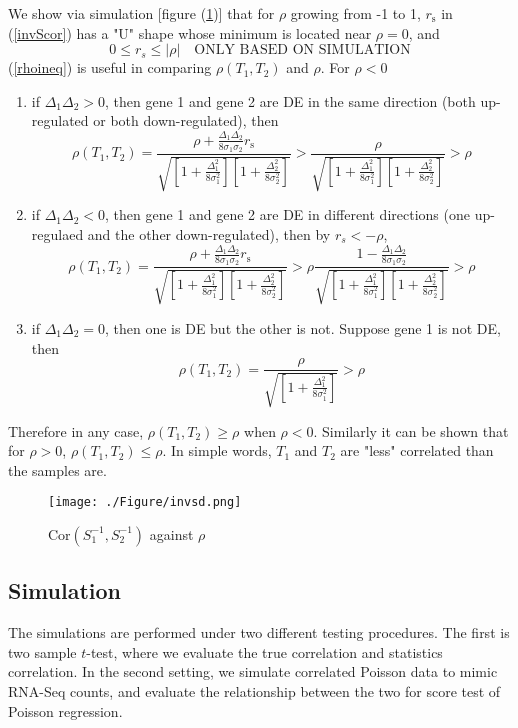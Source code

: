 \documentclass[11pt, a4paper]{article}
\begin{document}
We show via simulation [figure (\ref{invsd})] that for $\rho$ growing from -1 to 1, $r_{\text{s}}$ in (\ref{invScor}) has a "U" shape whose minimum is located near $\rho=0$, and  
\begin{equation}\label{rhoineq}
	0 \leq r_s \leq |\rho| \text{~~ ONLY BASED ON SIMULATION}
\end{equation}
(\ref{rhoineq}) is useful in comparing  $\rho({T_1, T_2})$  and $\rho$. 
For $\rho <0 $
\begin{enumerate}
	\item if $\Delta_1\Delta_2 >0$, then gene 1 and gene 2 are DE in the same direction (both  up-regulated or both down-regulated), then 
	\[\rho(T_1, T_2)= \frac{\rho + \frac{\Delta_1\Delta_2}{8\sigma_1\sigma_2}r_{\text{s}}}{\sqrt{  \left[ 1 + \frac{\Delta_1^2}{8\sigma_1^2}\right]\left[ 1 + \frac{\Delta_2^2}{8\sigma_2^2}\right]}}  >\frac{\rho }{\sqrt{  \left[ 1 + \frac{\Delta_1^2}{8\sigma_1^2}\right]\left[ 1 + \frac{\Delta_2^2}{8\sigma_2^2}\right]}} >\rho\]
	\item  if $\Delta_1\Delta_2 <0$, then gene 1 and gene 2 are DE in different directions (one up-regulaed and the other down-regulated), then by $r_s < -\rho$, 
	\[\rho(T_1, T_2)= \frac{\rho + \frac{\Delta_1\Delta_2}{8\sigma_1\sigma_2}r_{\text{s}}}{\sqrt{  \left[ 1 + \frac{\Delta_1^2}{8\sigma_1^2}\right]\left[ 1 + \frac{\Delta_2^2}{8\sigma_2^2}\right]}}  >\rho\frac{ 1-\frac{\Delta_1\Delta_2}{8\sigma_1\sigma_2}}{\sqrt{  \left[ 1 + \frac{\Delta_1^2}{8\sigma_1^2}\right]\left[ 1 + \frac{\Delta_2^2}{8\sigma_2^2}\right]}} >\rho\]
	\item if  $\Delta_1\Delta_2 =0$, then one is DE but the other is not. Suppose gene 1 is not DE, then
	\[\rho(T_1, T_2)= \frac{\rho}{\sqrt{  \left[ 1 + \frac{\Delta_1^2}{8\sigma_1^2}\right]}} >\rho \]
	
\end{enumerate}
Therefore in any case, $\rho(T_1, T_2) \geq \rho$ when $\rho <0$. Similarly it can be shown that for $\rho >0$, $\rho(T_1, T_2) \leq \rho $. In simple words,  $T_1$ and $T_2$ are "less" correlated than the samples are. 
\begin{figure}[!h]
	\centering
	\caption{$\text{Cor}(S^{-1}_1, S^{-1}_2)$ against $\rho$}
	\texttt{[image: ./Figure/invsd.png]}
	\label{invsd}
\end{figure}



\subsection{Simulation}
The simulations are performed under two different testing procedures. The first is two sample $t$-test, where we evaluate the true correlation and statistics correlation.  In the second setting, we simulate correlated Poisson data to mimic RNA-Seq counts, and evaluate the relationship between the two for score test of Poisson regression. \\
\end{document}
